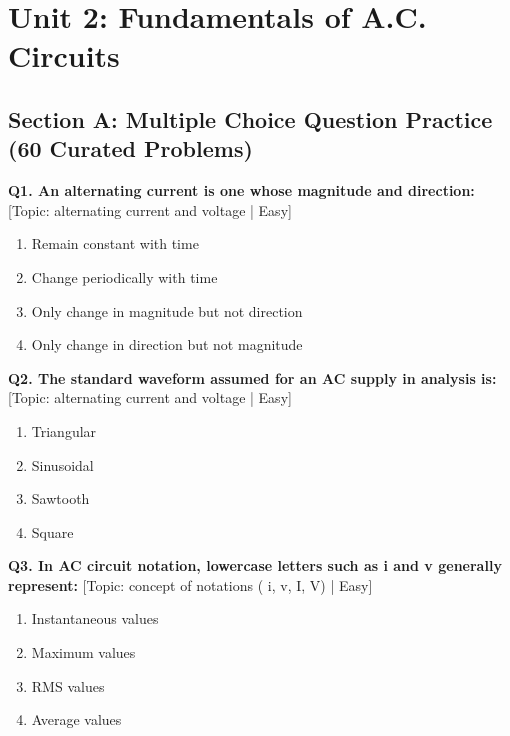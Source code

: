 \chapter{Unit 2: Fundamentals of A.C. Circuits}

\section{Section A: Multiple Choice Question Practice (60 Curated Problems)}

\noindent\textbf{Q1. An alternating current is one whose magnitude and direction:} \hfill [Topic: alternating current and voltage | Easy]
\begin{enumerate}[label=(\alph*),topsep=2pt,itemsep=1pt,partopsep=0pt,parsep=0pt]
    \item {Remain constant with time}
    \item {Change periodically with time}
    \item {Only change in magnitude but not direction}
    \item {Only change in direction but not magnitude}
\end{enumerate}
\vspace{2mm}

\noindent\textbf{Q2. The standard waveform assumed for an AC supply in analysis is:} \hfill [Topic: alternating current and voltage | Easy]
\begin{enumerate}[label=(\alph*),topsep=2pt,itemsep=1pt,partopsep=0pt,parsep=0pt]
    \item {Triangular}
    \item {Sinusoidal}
    \item {Sawtooth}
    \item {Square}
\end{enumerate}
\vspace{2mm}

\noindent\textbf{Q3. In AC circuit notation, lowercase letters such as i and v generally represent:} \hfill [Topic: concept of notations ( i, v, I, V) | Easy]
\begin{enumerate}[label=(\alph*),topsep=2pt,itemsep=1pt,partopsep=0pt,parsep=0pt]
    \item {Instantaneous values}
    \item {Maximum values}
    \item {RMS values}
    \item {Average values}
\end{enumerate}
\vspace{2mm}

